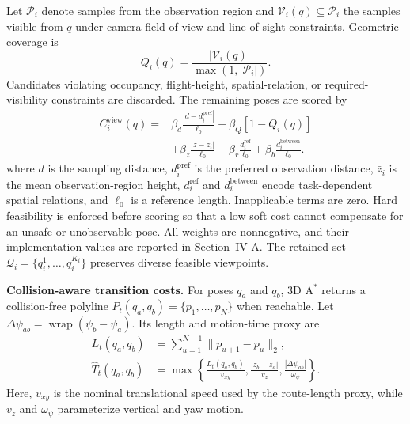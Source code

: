 \documentclass[letterpaper,10pt,conference]{ieeeconf}
\begin{document}
Let $\mathcal P_i$ denote samples from the observation region and $\mathcal V_i(q)\subseteq\mathcal P_i$ the samples visible from $q$ under camera field-of-view and line-of-sight constraints. Geometric coverage is
\begin{equation}
Q_i(q)=\frac{|\mathcal V_i(q)|}{\max(1,|\mathcal P_i|)}.
\end{equation}
Candidates violating occupancy, flight-height, spatial-relation, or required-visibility constraints are discarded. The remaining poses are scored by
\begin{equation}
\begin{aligned}
C_i^{\mathrm{view}}(q)={}&
\beta_d\frac{|d-d_i^{\mathrm{pref}}|}{\ell_0}
+\beta_Q[1-Q_i(q)]\\
&+\beta_z\frac{|z-\bar z_i|}{\ell_0}
+\beta_r\frac{d_i^{\mathrm{ref}}}{\ell_0}
+\beta_b\frac{d_i^{\mathrm{between}}}{\ell_0}.
\end{aligned}
\label{eq:view-cost}
\end{equation}
where $d$ is the sampling distance, $d_i^{\mathrm{pref}}$ is the preferred observation distance, $\bar z_i$ is the mean observation-region height, $d_i^{\mathrm{ref}}$ and $d_i^{\mathrm{between}}$ encode task-dependent spatial relations, and $\ell_0$ is a reference length. Inapplicable terms are zero. Hard feasibility is enforced before scoring so that a low soft cost cannot compensate for an unsafe or unobservable pose. All weights are nonnegative, and their implementation values are reported in Section~IV-A. The retained set $\mathcal Q_i=\{q_i^1,\ldots,q_i^{K_i}\}$ preserves diverse feasible viewpoints.

\textbf{Collision-aware transition costs.} For poses $q_a$ and $q_b$, 3D A$^*$ returns a collision-free polyline $P_t(q_a,q_b)=\{p_1,\ldots,p_N\}$ when reachable. Let $\Delta\psi_{ab}=\operatorname{wrap}(\psi_b-\psi_a)$. Its length and motion-time proxy are
\begin{equation}
\begin{aligned}
L_t(q_a,q_b)&=\sum_{u=1}^{N-1}\|p_{u+1}-p_u\|_2,\\
\widehat T_t(q_a,q_b)&=\max\left\{
\frac{L_t(q_a,q_b)}{v_{xy}},
\frac{|z_b-z_a|}{v_z},
\frac{|\Delta\psi_{ab}|}{\omega_\psi}
\right\}.
\end{aligned}
\label{eq:motion-cost}
\end{equation}
Here, $v_{xy}$ is the nominal translational speed used by the route-length proxy, while $v_z$ and $\omega_\psi$ parameterize vertical and yaw motion.
\end{document}
